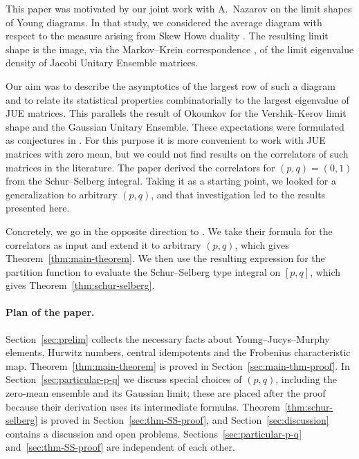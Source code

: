 \documentclass{article}
\theoremstyle{plain}
\theoremstyle{definition}
\numberwithin{equation}{section}
\begin{document}
This paper was motivated by our joint work with A.~Nazarov on the limit shapes of Young
diagrams. In that study, we considered the average
diagram with respect to the measure arising from Skew Howe duality \cite{betea2025limit}. The resulting limit shape is the
image, via the Markov--Krein correspondence \cite{kerov1993transition}, of the limit
eigenvalue density of Jacobi Unitary Ensemble matrices.

Our aim was to describe the asymptotics of the largest row of such a diagram
and to relate its statistical properties combinatorially to the largest
eigenvalue of JUE matrices. This parallels the result of Okounkov \cite{okounkov2000random} for the Vershik--Kerov limit shape and the Gaussian Unitary
Ensemble. These expectations were formulated as conjectures in
\cite{nazarov2025randomyoungdiagramsjacobi}. For this purpose it is more convenient to work with
JUE matrices with zero mean, but we could not find results on the
correlators of such matrices in the literature. The paper
\cite{gisonni2021jacobi} derived the correlators for $(p,q)=(0,1)$ from the
Schur--Selberg integral. Taking it as a starting point, we looked for a
generalization to arbitrary $(p,q)$, and that investigation led to the results
presented here.

Concretely, we go in the opposite direction to \cite{gisonni2021jacobi}. We
take their formula for the correlators as input and extend it to arbitrary
$(p,q)$, which gives Theorem~\ref{thm:main-theorem}. We then use the
resulting expression for the partition function to evaluate the
Schur--Selberg type integral on $[p,q]$, which gives
Theorem~\ref{thm:schur-selberg}.

\paragraph{Plan of the paper.}
Section~\ref{sec:prelim} collects the necessary facts about
Young--Jucys--Murphy elements, Hurwitz numbers, central idempotents and the
Frobenius characteristic map. Theorem~\ref{thm:main-theorem} is proved in
Section~\ref{sec:main-thm-proof}. In Section~\ref{sec:particular-p-q} we discuss special choices of
$(p,q)$, including the zero-mean ensemble and its Gaussian limit; these are
placed after the proof because their derivation uses its intermediate
formulas. Theorem~\ref{thm:schur-selberg} is proved in Section~\ref{sec:thm-SS-proof}, and Section~\ref{sec:discussion} contains a discussion and open problems. Sections~\ref{sec:particular-p-q} and~\ref{sec:thm-SS-proof} are independent of each other.
\end{document}
